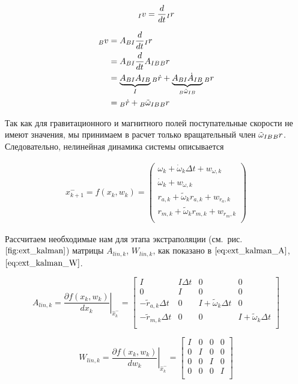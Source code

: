 \documentclass[12pt,a4paper]{article}
\begin{document}
$$ {\vphantom v}_I v = \frac{d}{dt} {\vphantom r}_I r $$

\begin{align*}
	{\vphantom v}_B v &= A_{BI} \frac{d}{dt} {\vphantom r}_I r \\
	&= A_{BI} \frac{d}{dt} A_{IB} {\vphantom r}_B r \\
	&= \underbrace{A_{BI}A_{IB}}_I {\vphantom r}_B \dot r + \underbrace{A_{BI}\dot A_{IB}}_{{\vphantom \omega}_B \tilde\omega_{IB}} {\vphantom r}_B r \\
	&= {\vphantom r}_B \dot r +  {\vphantom \omega}_B \tilde\omega_{IB} {\vphantom r}_B r 
\end{align*}

Так как для гравитационного и магнитного полей поступательные скорости не имеют значения, мы принимаем в расчет только вращательный член $\tilde\omega_{IB} {\vphantom r}_B r$. Следовательно, нелинейная динамика системы описывается

\begin{align*}
	x_{k+1}^- = f(x_k,w_k) = 
	\begin{pmatrix}
		\omega_k + \dot\omega_k\Delta t + w_{\omega,k} \\
		\dot\omega_k + w_{\dot\omega,k} \\
		r_{a,k} + \tilde\omega_k r_{a,k} + w_{r_a,k} \\
		r_{m,k} + \tilde\omega_k r_{m,k} + w_{r_m,k} \\
	\end{pmatrix}
\end{align*}

Рассчитаем необходимые нам для этапа экстраполяции (см.~рис.~$\ref{fig:ext_kalman}$) матрицы $A_{lin,k}$, $W_{lin,k}$, как показано в $\eqref{eq:ext_kalman_A}$,~$\eqref{eq:ext_kalman_W}$.

\begin{equation*}
	A_{lin,k} = \left. \frac{\partial f(x_k,w_k)}{dx_k} \right|_{\hat x_k^-} = 
	\begin{bmatrix}
		I & I\Delta t & 0 & 0 \\
		0 & I & 0 & 0 \\
		-\tilde r_{a,k}\Delta t & 0 & I + \tilde \omega_k \Delta t & 0 \\
		-\tilde r_{m,k}\Delta t & 0 & 0 & I + \tilde \omega_k \Delta t \\
	\end{bmatrix}
\end{equation*}

\begin{equation*}
	W_{lin,k} = \left. \frac{\partial f(x_k,w_k)}{dw_k} \right|_{\hat x_k^-} = 
	\begin{bmatrix}
		I & 0 & 0 & 0 \\
		0 & I & 0 & 0 \\
		0 & 0 & I & 0 \\
		0 & 0 & 0 & I \\
	\end{bmatrix}
\end{equation*}
\end{document}
